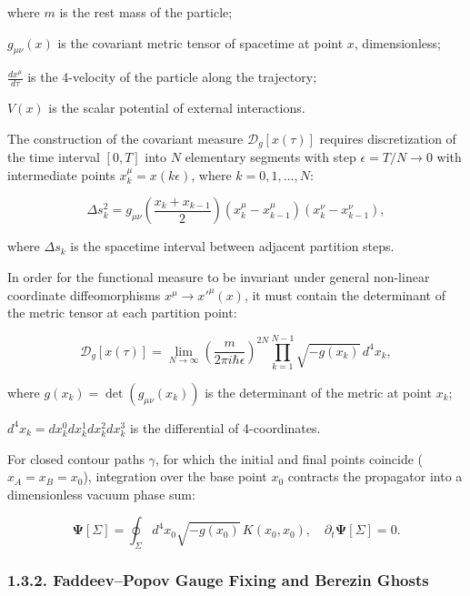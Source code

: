 \documentclass[11pt,a4paper]{article}
\theoremstyle{definition}
\begin{document}
where $m$ is the rest mass of the particle;  

$g_{\mu\nu}(x)$ is the covariant metric tensor of spacetime at point $x$, dimensionless;  

$\frac{dx^\mu}{d\tau}$ is the 4-velocity of the particle along the trajectory;  

$V(x)$ is the scalar potential of external interactions.

The construction of the covariant measure $\mathcal{D}_g[x(\tau)]$ requires discretization of the time interval $[0, T]$ into $N$ elementary segments with step $\epsilon = T/N \to 0$ with intermediate points $x_k^\mu = x(k\epsilon)$, where $k = 0, 1, \dots, N$:

\begin{equation}\label{eq:1.35}\tag{1.35}
\Delta s_k^2 = g_{\mu\nu}\left(\frac{x_k + x_{k-1}}{2}\right) (x_k^\mu - x_{k-1}^\mu) (x_k^\nu - x_{k-1}^\nu),
\end{equation}

where $\Delta s_k$ is the spacetime interval between adjacent partition steps.

In order for the functional measure to be invariant under general non-linear coordinate diffeomorphisms $x^\mu \to x'^\mu(x)$, it must contain the determinant of the metric tensor at each partition point:

\begin{equation}\label{eq:1.36}\tag{1.36}
\mathcal{D}_g[x(\tau)] = \lim_{N\to\infty} \left( \frac{m}{2\pi i \hbar \epsilon} \right)^{2N} \prod_{k=1}^{N-1} \sqrt{-g(x_k)} \, d^4x_k,
\end{equation}

where $g(x_k) = \det(g_{\mu\nu}(x_k))$ is the determinant of the metric at point $x_k$;  

$d^4x_k = dx_k^0 dx_k^1 dx_k^2 dx_k^3$ is the differential of 4-coordinates.

For closed contour paths $\gamma$, for which the initial and final points coincide ($x_A = x_B = x_0$), integration over the base point $x_0$ contracts the propagator into a dimensionless vacuum phase sum:

\begin{equation}\label{eq:1.41}\tag{1.41}
\mathbf{\Psi}[\Sigma] = \oint_{\Sigma} d^4x_0 \sqrt{-g(x_0)} \, K(x_0, x_0), \quad \partial_t \mathbf{\Psi}[\Sigma] = 0.
\end{equation}


\subsubsection{1.3.2. Faddeev--Popov Gauge Fixing and Berezin Ghosts}\label{sec:1.3.2}
\end{document}
